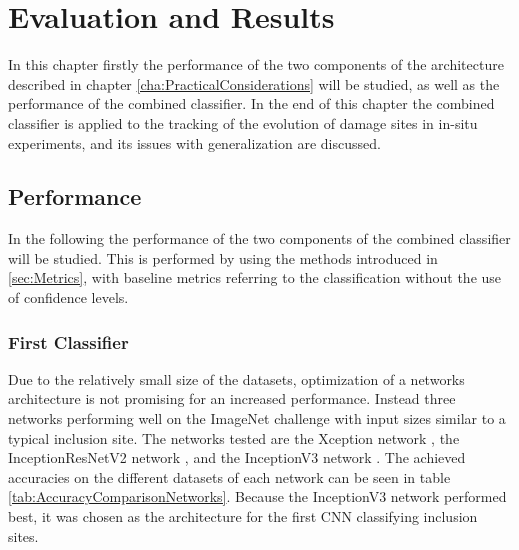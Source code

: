 
\chapter{Evaluation and Results} %

\label{Performance} %

In this chapter firstly the performance of the two components of the architecture described in chapter \ref{cha:PracticalConsiderations} will be studied, as well as the performance of the combined classifier. In the end of this chapter the combined classifier is applied to the tracking of the evolution of damage sites in in-situ experiments, and its issues with generalization are discussed.

\section{Performance}
In the following the performance of the two components of the combined classifier will be studied. This is performed by using the methods introduced in \ref{sec:Metrics}, with baseline metrics referring to the classification without the use of confidence levels.

\subsection{First Classifier}

Due to the relatively small size of the datasets, optimization of a networks architecture is not promising for an increased performance. Instead three networks performing well on the ImageNet challenge \cite{imagenet_cvpr09} with input sizes similar to a typical inclusion site. The networks tested are the Xception network \cite{Xception}, the InceptionResNetV2 network \cite{InceptionResNetV2}, and the InceptionV3 network \cite{inception}. The achieved accuracies on the different datasets of each network can be seen in table \ref{tab:AccuracyComparisonNetworks}. Because the InceptionV3 network performed best, it was chosen as the architecture for the first CNN classifying inclusion sites. \\



